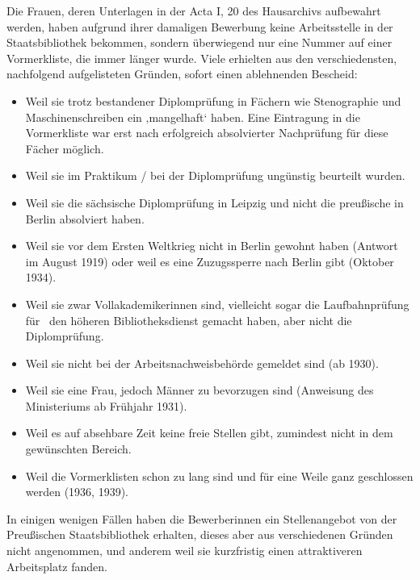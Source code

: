 \documentclass[a4paper,
fontsize=11pt,
oneside,
numbers=noperiodatend,
parskip=half-,
bibliography=totoc,
final
]{scrartcl}
\begin{document}
Die Frauen, deren Unterlagen in der Acta I, 20 des Hausarchivs
aufbewahrt werden, haben aufgrund ihrer damaligen Bewerbung keine
Arbeitsstelle in der Staatsbibliothek bekommen, sondern überwiegend nur
eine Nummer auf einer Vormerkliste, die immer länger wurde. Viele
erhielten aus den verschiedensten, nachfolgend aufgelisteten Gründen,
sofort einen ablehnenden Bescheid:~

\begin{itemize}
\item
  Weil sie trotz bestandener Diplomprüfung in Fächern wie Stenographie
  und~ Maschinenschreiben ein ‚mangelhaft` haben. Eine Eintragung in die
  Vormerkliste war erst nach erfolgreich absolvierter Nachprüfung für
  diese Fächer möglich.
\item
  Weil sie im Praktikum / bei der Diplomprüfung ungünstig beurteilt
  wurden.
\item
  Weil sie die sächsische Diplomprüfung in Leipzig und nicht die
  preußische in Berlin absolviert haben.
\item
  Weil sie vor dem Ersten Weltkrieg nicht in Berlin gewohnt haben
  (Antwort im August 1919) oder weil es eine Zuzugssperre nach Berlin
  gibt (Oktober 1934).
\item
  Weil sie zwar Vollakademikerinnen sind, vielleicht sogar die
  Laufbahnprüfung für~ den höheren Bibliotheksdienst gemacht haben, aber
  nicht die Diplomprüfung.
\item
  Weil sie nicht bei der Arbeitsnachweisbehörde gemeldet sind (ab 1930).
\item
  Weil sie eine Frau, jedoch Männer zu bevorzugen sind (Anweisung des
  Ministeriums ab Frühjahr 1931).
\item
  Weil es auf absehbare Zeit keine freie Stellen gibt, zumindest nicht
  in dem~ gewünschten Bereich.
\item
  Weil die Vormerklisten schon zu lang sind und für eine Weile ganz
  geschlossen werden (1936, 1939).
\end{itemize}

In einigen wenigen Fällen haben die Bewerberinnen ein Stellenangebot von
der Preußischen Staatsbibliothek erhalten, dieses aber aus verschiedenen
Gründen nicht angenommen, und anderem weil sie kurzfristig einen
attraktiveren Arbeitsplatz fanden.
\end{document}
